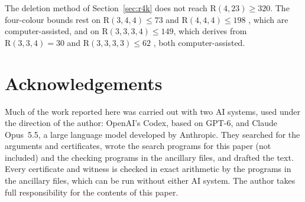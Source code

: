 \documentclass[11pt]{article}
\theoremstyle{spacedplain}
\theoremstyle{spaceddef}
\theoremstyle{spacedremark}
\newcommand{\R}{\mathrm{R}}
\begin{document}
The deletion method of Section~\ref{sec:r4k} does not reach $\R(4,23)\ge 320$.
The four-colour bounds rest on $\R(3,4,4)\le 73$ and $\R(4,4,4)\le 198$ \cite[Theorems~8.3 and~8.2]{DC26}, which are computer-assisted, and on $\R(3,3,3,4)\le 149$, which \cite[6.1(a)]{Rad26} derives from $\R(3,3,4)=30$ \cite{CFIM16} and $\R(3,3,3,3)\le 62$ \cite{FKR04}, both computer-assisted.

\section*{Acknowledgements}
Much of the work reported here was carried out with two AI systems, used under the direction of the author: OpenAI's Codex, based on GPT-6, and Claude Opus~5.5, a large language model developed by Anthropic.
They searched for the arguments and certificates, wrote the search programs for this paper (not included) and the checking programs in the ancillary files, and drafted the text.
Every certificate and witness is checked in exact arithmetic by the programs in the ancillary files, which can be run without either AI system.
The author takes full responsibility for the contents of this paper.
\end{document}
